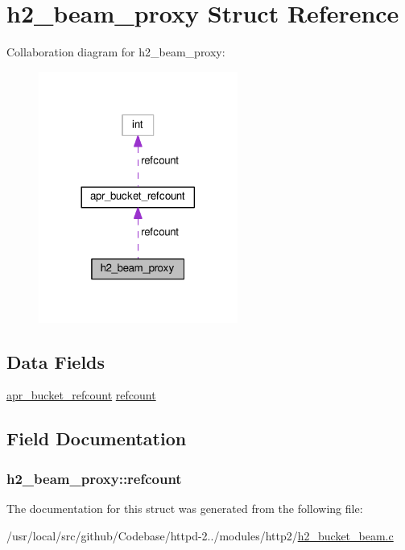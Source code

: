 \hypertarget{structh2__beam__proxy}{}\section{h2\+\_\+beam\+\_\+proxy Struct Reference}
\label{structh2__beam__proxy}


Collaboration diagram for h2\+\_\+beam\+\_\+proxy\+:
\nopagebreak
\begin{figure}[H]
\begin{center}
\leavevmode
\includegraphics[width=185pt]{structh2__beam__proxy__coll__graph}
\end{center}
\end{figure}
\subsection*{Data Fields}
\begin{DoxyCompactItemize}
\item 
\hyperlink{structapr__bucket__refcount}{apr\+\_\+bucket\+\_\+refcount} \hyperlink{structh2__beam__proxy_abdc2f0dc4bec811e95b149f701941a2c}{refcount}
\end{DoxyCompactItemize}


\subsection{Field Documentation}
\subsubsection[{\texorpdfstring{refcount}{refcount}}]{ h2\+\_\+beam\+\_\+proxy\+::refcount}\hypertarget{structh2__beam__proxy_abdc2f0dc4bec811e95b149f701941a2c}{}\label{structh2__beam__proxy_abdc2f0dc4bec811e95b149f701941a2c}


The documentation for this struct was generated from the following file\+:\begin{DoxyCompactItemize}
\item 
/usr/local/src/github/\+Codebase/httpd-\/2../modules/http2/\hyperlink{h2__bucket__beam_8c}{h2\+\_\+bucket\+\_\+beam.\+c}\end{DoxyCompactItemize}

